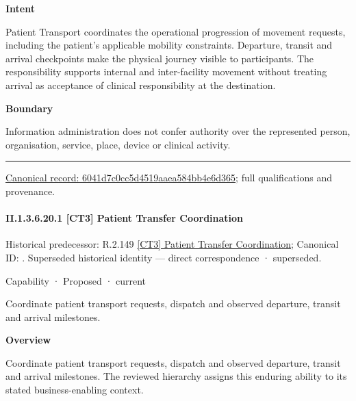 \textbf{Intent}



Patient Transport coordinates the operational progression of movement requests, including the patient's applicable mobility constraints. Departure, transit and arrival checkpoints make the physical journey visible to participants. The responsibility supports internal and inter-facility movement without treating arrival as acceptance of clinical responsibility at the destination.



\textbf{Boundary}



Information administration does not confer authority over the represented person, organisation, service, place, device or clinical activity.



\medskip\hrule\medskip

{\footnotesize \href{../../../../../../../continuum/strategy/capability/6041d7c0cc5d4519aaea584bb4e6d365.md}{Canonical record: 6041d7c0cc5d4519aaea584bb4e6d365}; full qualifications and provenance.}\par
\paragraph*{II.1.3.6.20.1 [CT3] Patient Transfer Coordination}
\label{navigation:II.1.3.6.20.1}

{\small Historical predecessor: R.2.149 \hyperref[element:b5a76d4877424b2ea9b01fb5fa22772c]{[CT3] Patient Transfer Coordination}; Canonical ID: \texttt{}. Superseded historical identity — direct correspondence · superseded.}\par
\label{element:c7c7aa8e34df4568ae4b91cdde380a11}
{\small Capability · Proposed · current}\par

Coordinate patient transport requests, dispatch and observed departure, transit and arrival milestones.



\textbf{Overview}



Coordinate patient transport requests, dispatch and observed departure, transit and arrival milestones. The reviewed hierarchy assigns this enduring ability to its stated business-enabling context.



